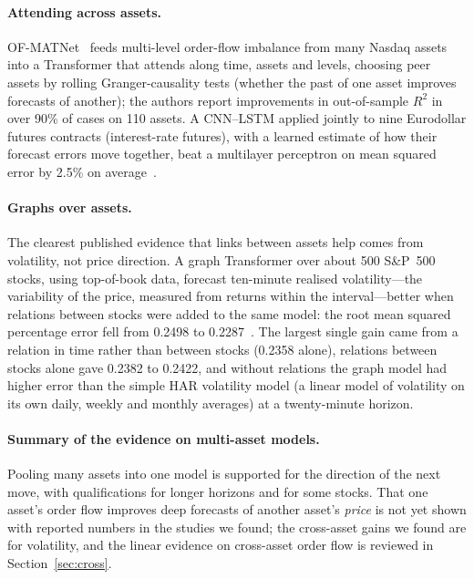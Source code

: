\paragraph{Attending across assets.} OF-MATNet~\citep{ofmatnet} feeds multi-level order-flow imbalance from
many Nasdaq assets into a Transformer that attends along time, assets and levels, choosing peer assets by
rolling Granger-causality tests (whether the past of one asset improves forecasts of another); the authors report improvements in out-of-sample $R^2$ in over 90\% of
cases on 110 assets. A CNN--LSTM applied jointly to nine
Eurodollar futures contracts (interest-rate futures), with a learned estimate of how their forecast errors move
together, beat a multilayer perceptron
on mean squared error by 2.5\% on average~\citep{spears2021eurodollar}.

\paragraph{Graphs over assets.} The clearest published evidence that links between assets help comes from
volatility, not price direction. A graph Transformer over about 500 S\&P~500 stocks, using top-of-book data,
forecast ten-minute realised volatility---the variability of the price, measured from returns within the
interval---better when relations between stocks were added to the same model: the root mean squared percentage
error fell from 0.2498 to 0.2287~\citep{chen2022gtnvf}. The
largest single gain came from a relation in time rather than between stocks (0.2358 alone), relations between
stocks alone gave 0.2382 to 0.2422, and without relations the graph model had higher error than the simple HAR
volatility model (a linear model of volatility on its own daily, weekly and monthly averages) at a twenty-minute
horizon.

\paragraph{Summary of the evidence on multi-asset models.} Pooling many assets into one model is supported for the direction
of the next move, with qualifications for longer horizons and for some stocks. That one asset's order flow
improves deep forecasts of another asset's \emph{price} is not yet shown with reported numbers in the studies
we found; the cross-asset gains we found are for volatility, and the linear evidence on cross-asset
order flow is reviewed in Section~\ref{sec:cross}.

